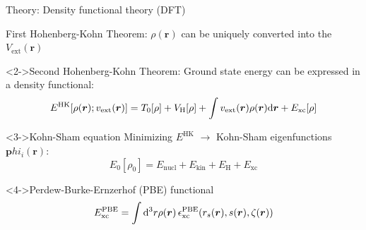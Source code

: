 \begin{frame}{Theory: Density functional theory (DFT)}	
	\begin{block}{First Hohenberg-Kohn Theorem:}
		$\rho(\boldsymbol{r})$ can be uniquely converted into the $V_\text{ext}(\boldsymbol{r})$
	\end{block}
	\begin{block}<2->{Second Hohenberg-Kohn Theorem:}
		Ground state energy can be expressed in a density functional: \vspace{-.35cm}
		\begin{equation*}
		E^{\text{HK}}[\rho(\boldsymbol{r}); v_{\text{ext}}(\boldsymbol{r})] = 
		T_0 [\rho] + V_\text{H} [\rho] + \int v_{\text{ext}}(\boldsymbol{r}) \rho(\boldsymbol{r}) \mathrm{d} \boldsymbol{r} + E_{\text{xc}} [\rho]
		\end{equation*}
	\end{block}
	\begin{block}<3->{Kohn-Sham equation}
		Minimizing $E^{\text{HK}}$ $\rightarrow$ Kohn-Sham eigenfunctions $\boldsymbol{p}hi_i(\boldsymbol{r})$: \vspace{-.35cm}
		\begin{equation*} 
		E_0 [\rho_0] = E_{\text{nucl}} + E_{\text{kin}} + E_\text{H} + E_{\text{xc}} 
		\end{equation*}
	\end{block}
	\begin{block}<4->{Perdew-Burke-Ernzerhof (PBE) functional} \vspace{-.15cm}
		\begin{equation*}
		E_{\text{xc}}^{\text{PBE}} = \int \mathrm{d}^3 r \rho(\boldsymbol{r}) 
		\,\epsilon_{\text{xc}}^{\text{PBE}} (r_s (\boldsymbol{r}), s(\boldsymbol{r}), \zeta(\boldsymbol{r}))
		\end{equation*}
	\end{block}
\end{frame}

